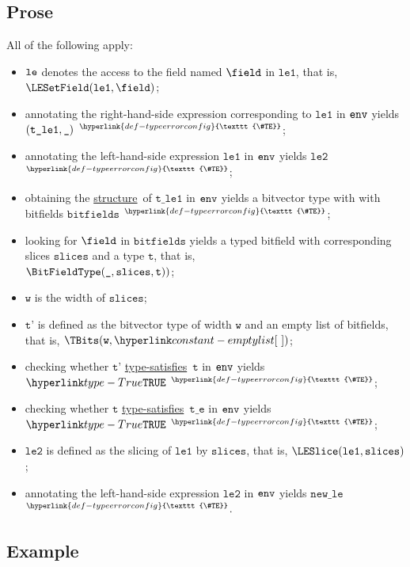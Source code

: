 \documentclass{book}
\newcommand\TypeErrorConfig[0]{\hyperlink{def-typeerrorconfig}{\texttt{\#TE}}}
\newcommand\ProseOrTypeError[0]{\hyperlink{def-proseortypeerror}{$^{\TypeErrorConfig}$}}
\newcommand\structure[0]{\hyperlink{def-structure}{structure}}
\newcommand\typesatisfies[0]{\hyperlink{def-typesatisfies}{type-satisfies}}
\newcommand\vt[0]{\texttt{t}}
\newcommand\vte[0]{\texttt{t\_e}}
\newcommand\vleone[0]{\texttt{le1}}
\newcommand\vletwo[0]{\texttt{le2}}
\newcommand\vtleone[0]{\texttt{t\_le1}}
\newcommand\vw[0]{\texttt{w}}
\newcommand\bitfields[0]{\texttt{bitfields}}
\newcommand\vslices[0]{\texttt{slices}}
\newcommand\newle[0]{\texttt{new\_le}}
\newcommand\slices[0]{\texttt{slices}}
\newcommand\vtp[0]{\texttt{t'}}
\begin{document}
\subsection{Prose}
All of the following apply:
\begin{itemize}
  \item $\texttt{le}$ denotes the access to the field named $\field$ in $\vleone$, that is, \\ $\LESetField(\vleone, \field)$;
  \item annotating the right-hand-side expression corresponding to $\vleone$ in $\texttt{env}$ yields \\ $(\vtleone, \Ignore)$ \ProseOrTypeError;
  \item annotating the left-hand-side expression $\vleone$ in $\texttt{env}$ yields $\vletwo$ \ProseOrTypeError;
  \item obtaining the \structure\ of $\vtleone$ in $\texttt{env}$ yields a bitvector type with with bitfields $\bitfields$ \ProseOrTypeError;
  \item looking for $\field$ in $\bitfields$ yields a typed bitfield with corresponding slices $\slices$ and a type $\vt$,
        that is, \\ $\BitFieldType(\Ignore, \vslices, \vt))$;
  \item $\vw$ is the width of $\slices$;
  \item $\vtp$ is defined as the bitvector type of width $\vw$ and an empty list of bitfields, that is, $\TBits(\vw , \emptylist)$;
  \item checking whether $\vtp$ \typesatisfies\ $\vt$ in $\texttt{env}$ yields $\True$ \ProseOrTypeError;
  \item checking whether $\vt$ \typesatisfies\ $\vte$ in $\texttt{env}$ yields $\True$ \ProseOrTypeError;
  \item $\vletwo$ is defined as the slicing of $\vleone$ by $\slices$, that is, $\LESlice(\vleone, \slices)$;
  \item annotating the left-hand-side expression $\vletwo$ in $\texttt{env}$ yields $\newle$ \ProseOrTypeError.
\end{itemize}

\subsection{Example}

\end{document}
